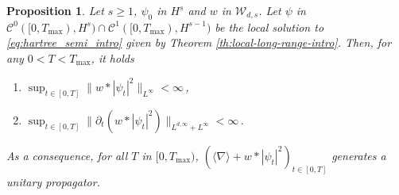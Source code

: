 \documentclass[12pt]{article}
\theoremstyle{plain}
\newtheorem{prop}[theo]{Proposition}
\begin{document}
\begin{prop}\label{cor:estimates-conv-potential-for-unitary-propagator}Let $s\geq 1$, $\psi_0$ in $H^{s}$ and $w$ in $\mathcal{W}_{d,s}$. Let  $\psi$ in $\mathcal{C}^0([0,T_{\mathrm{max}}),H^s) \cap \mathcal{C}^1([0,T_{\mathrm{max}}),H^{s-1})$ be the local solution to \eqref{eq:hartree_semi_intro} given by Theorem \ref{th:local-long-range-intro}. Then, for any $0<T<T_{\mathrm{max}}$, it holds
\begin{enumerate}
    \item  $\sup_{t\in [0,T]}\|w*|\psi_t|^2\|_{L^\infty}<\infty$\,,
    \item $ \sup_{t\in [0,T]}\|\partial_t (w*|\psi_t|^2)\|_{L^{d,\infty}+L^\infty} < \infty$\,.
\end{enumerate}
As a consequence, for all $T$ in $[0,T_{\mathrm{max}})$,  $(\langle\nabla\rangle + w*|\psi_t|^2)_{t\in[0,T]}$ generates a unitary propagator.
\end{prop}
%
\end{document}
